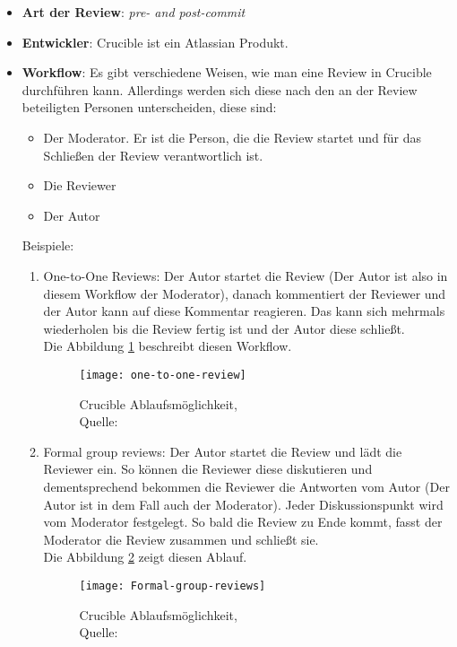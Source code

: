 \begin{itemize}
	\item \textbf{Art der Review}: \textit{pre- and post-commit}
	\item \textbf{Entwickler}: Crucible ist ein Atlassian Produkt.
	\item \textbf{Workflow}: Es gibt verschiedene Weisen, wie man eine Review in Crucible durchführen kann. Allerdings werden sich diese nach den an der Review beteiligten Personen
		 unterscheiden, diese sind:
		\begin{itemize}
			\item Der Moderator. Er ist die Person, die die Review startet und für das Schließen der Review verantwortlich ist.
			\item Die Reviewer
			\item Der Autor
		\end{itemize}
		Beispiele:
		
		\begin{enumerate}
			\item One-to-One Reviews: Der Autor startet die Review (Der Autor ist also in diesem Workflow der Moderator), danach kommentiert der Reviewer und der Autor kann auf diese
				Kommentar reagieren. Das kann sich mehrmals wiederholen bis die Review fertig ist und der Autor diese schließt.\\
				Die Abbildung \ref{fig:one-to-one-workflow} beschreibt diesen Workflow.
				\begin{figure}[H]
					\centering
					\texttt{[image: one-to-one-review]}
					\caption[Crucible: one-to-one-review]{Crucible Ablaufsmöglichkeit,\\ Quelle: \cite{Crucible}}
					\label{fig:one-to-one-workflow}
				\end{figure}
				
			\item Formal group reviews: Der Autor startet die Review und lädt die Reviewer ein. So können die Reviewer diese diskutieren und dementsprechend bekommen die Reviewer 
				die Antworten vom Autor (Der Autor ist in dem Fall auch der Moderator). Jeder Diskussionspunkt wird vom Moderator festgelegt. So bald die Review zu Ende kommt,
				fasst der Moderator die Review zusammen und schließt sie.\\
				Die Abbildung \ref{fig:Formal-group-review} zeigt diesen Ablauf.
				\begin{figure}[H]
					\centering
					\texttt{[image: Formal-group-reviews]}
					\caption[Crucible: Formal group review]{Crucible Ablaufsmöglichkeit,\\ Quelle:\cite{Crucible}}
					\label{fig:Formal-group-review}
				\end{figure}
		\end{enumerate}
		
\end{itemize}

